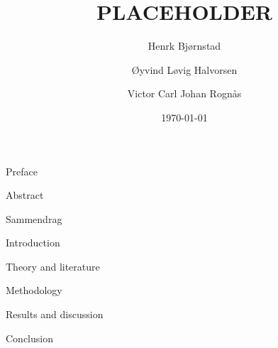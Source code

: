 \documentclass[12pt]{article}
\begin{document}
\author{Henrk Bjørnstad \and Øyvind Løvig Halvorsen \and Victor Carl Johan Rognås}
\title{PLACEHOLDER}
\date{\today}

{Preface}
\newpage

{Abstract}
\newpage

{Sammendrag}
\newpage

\begin{spacing}{0.8}
    \listoffigures
    
    \listoftables
    \newpage
    
    \tableofcontents
    \newpage
\end{spacing}

\setcounter{page}{1}
{Introduction}

\newpage
{Theory and literature}

\newpage
{Methodology}

\newpage
{Results and discussion}

\newpage
{Conclusion}

\newpage
\newrefcontext[sorting=nyt]
\printbibliography[heading = bibintoc, title = Works Cited]
\end{document}
